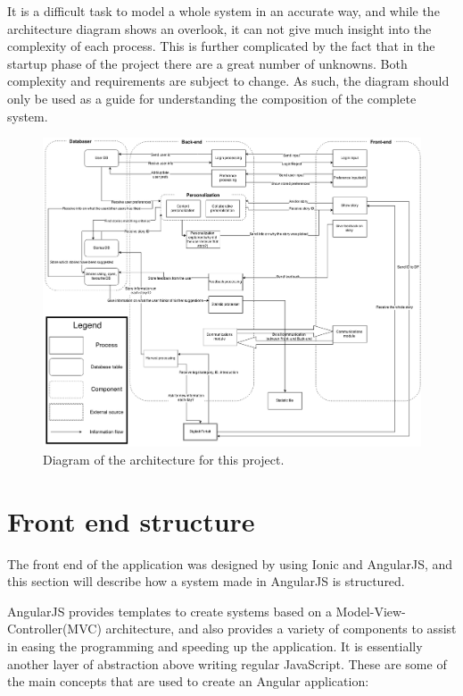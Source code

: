 It is a difficult task to model a whole system in an accurate way, and while the architecture diagram shows an overlook, it can not give much insight into the complexity of each process. This is further complicated by the fact that in the startup phase of the project there are a great number of unknowns. Both complexity and requirements are subject to change. As such, the diagram should only be used as a guide for understanding the composition of the complete system.

\begin{figure}[h!]
	\centering
	\includegraphics[width=\textwidth]{fig/architecture}
	\caption{Diagram of the architecture for this project.}
	\label{Fig:architecture}
\end{figure}

\section{Front end structure}
The front end of the application was designed by using Ionic and AngularJS, and this section will describe how a system made in AngularJS is structured.

AngularJS provides templates to create systems based on a Model-View-Controller(MVC) architecture, and also provides a variety of components to assist in easing the programming and speeding up the application. It is essentially another layer of abstraction above writing regular JavaScript. These are some of the main concepts that are used to create an Angular application:

